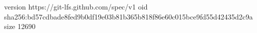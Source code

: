 version https://git-lfs.github.com/spec/v1
oid sha256:bd57cdbade8fed9b0df19e03b81b365b818f86e60c015bce9fd55d42435d2c9a
size 12690
